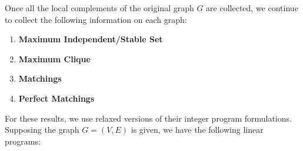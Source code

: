 \documentclass[12pt]{report} %
\begin{document}
\newpage 

Once all the local complements of the original graph $G$ are collected, we continue to 
collect the following information on each graph: 

\begin{enumerate}[label=(\roman*), font=\itshape]
    \item \textbf{Maximum Independent/Stable Set}
    \item \textbf{Maximum Clique}
    \item \textbf{Matchings}
    \item \textbf{Perfect Matchings}
\end{enumerate}

For these results, we use relaxed versions of their integer program formulations. Supposing the graph $G = (V, E)$ is given, 
we have the following linear programs: 

\vspace{1em}
\end{document}
